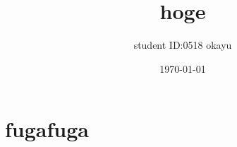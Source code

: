 \documentclass[a4paper, dvipdfmx]{jsarticle}
\title{\Large{hoge}}
\author{
	student ID:0518
	okayu
}
\date{\today}
\begin{document}
\maketitle


\section*{fugafuga}



\end{document}
